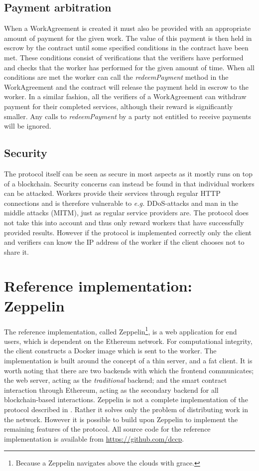 \subsection{Payment arbitration}
When a WorkAgreement is created it must also be provided with an appropriate amount of payment for the given work. The value of this payment is then held in escrow by the contract until some specified conditions in the contract have been met. These conditions consist of verifications that the verifiers have performed and checks that the worker has performed for the given amount of time. When all conditions are met the worker can call the \textit{redeemPayment} method in the WorkAgreement and the contract will release the payment held in escrow to the worker. In a similar fashion, all the verifiers of a WorkAgreement can withdraw payment for their completed services, although their reward is significantly smaller. Any calls to \textit{redeemPayment} by a party not entitled to receive payments will be ignored.

\subsection{Security}
The protocol itself can be seen as secure in most aspects as it mostly runs on top of a blockchain. Security concerns can instead be found in that individual workers can be attacked. Workers provide their services through regular HTTP connections and is therefore vulnerable to \textit{e.g.} DDoS-attacks and man in the middle attacks (MITM), just as regular service providers are. The protocol does not take this into account and thus only reward workers that have successfully provided results. However if the protocol is implemented correctly only the client and verifiers can know the IP address of the worker if the client chooses not to share it.

\section{Reference implementation: Zeppelin}
The reference implementation, called Zeppelin\footnote{Because a Zeppelin navigates above the clouds with grace.}, is a web application for end users, which is dependent on the Ethereum network. For computational integrity, the client constructs a Docker image which is sent to the worker. The implementation is built around the concept of a thin server, and a fat client. It is worth noting that there are two backends with which the frontend communicates; the web server, acting as the \textit{traditional} backend; and the smart contract interaction through Ethereum, acting as the secondary backend for all blockchain-based interactions. Zeppelin is not a complete implementation of the protocol described in . Rather it solves only the problem of distributing work in the network. However it is possible to build upon Zeppelin to implement the remaining features of the protocol.
All source code for the reference implementation is available from \href{https://github.com/dccp}{https://github.com/dccp}.

